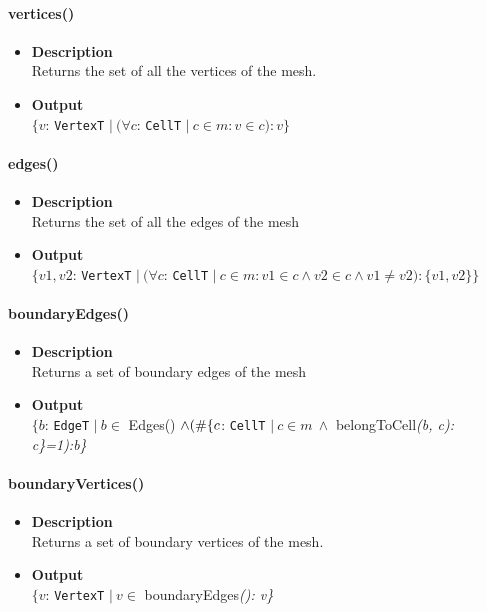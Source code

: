 \documentclass[12pt,titlepage]{article}
\begin{document}
\paragraph{vertices()}
\begin{itemize}
\item \textbf{Description}\\
Returns the set of all the vertices of the mesh.
\item \textbf{Output} \\
$\{v$: {\tt VertexT} $|\ (\forall c$: {\tt CellT} $|\ c\in m:v\in c):v\}$
\end{itemize}

\paragraph{edges()}
\begin{itemize}
\item \textbf{Description}\\
Returns the set of all the edges of the mesh
\item \textbf{Output} \\
$\{v1,v2$: {\tt VertexT} $|\ (\forall c$: {\tt CellT} $|\ c\in m:v1\in c \wedge v2\in c \wedge v1 \neq v2):\{v1, v2\}\}$
\end{itemize}

\paragraph{boundaryEdges()}
\begin{itemize}
\item \textbf{Description}\\
Returns a set of boundary edges of the mesh
\item \textbf{Output} \\
$ \{ b$: {\tt EdgeT} $|\ b\in$ Edges() $\wedge\\ (\# \{c$: {\tt CellT} $|\ c\in m\ \wedge$ belongToCell{\it (b, c): c\}=1):b\}}
\end{itemize}

\paragraph{boundaryVertices()}
\begin{itemize}
\item \textbf{Description}\\
Returns a set of boundary vertices of the mesh.
\item \textbf{Output} \\
$ \{v$: {\tt VertexT} $|\ v\in$  boundaryEdges{\it(): v\}}
\end{itemize}
\end{document}
